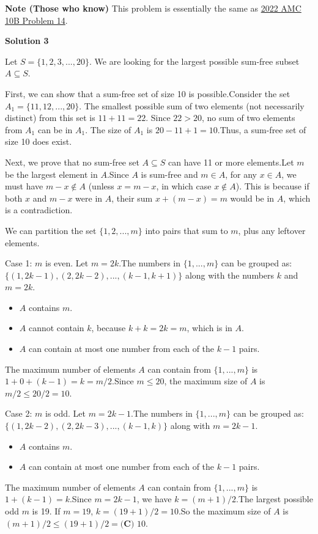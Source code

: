 \begin{enumerate}
 \textbf{Note (Those who know)} This problem is essentially the same as \href{https://artofproblemsolving.com/wiki/index.php?title=2022\_AMC\_10B\_Problems/Problem\_14}{2022 AMC 10B Problem 14}.

 



\textbf{Solution 3}

Let $S = \{1, 2, 3, ..., 20\}$. We are looking for the largest possible sum-free subset $A \subseteq S$.

 First, we can show that a sum-free set of size 10 is possible.Consider the set $A_1 = \{11, 12, ..., 20\}$. The smallest possible sum of two elements (not necessarily distinct) from this set is $11 + 11 = 22$. Since $22 > 20$, no sum of two elements from $A_1$ can be in $A_1$. The size of $A_1$ is $20 - 11 + 1 = 10$.Thus, a sum-free set of size 10 does exist.

 Next, we prove that no sum-free set $A \subseteq S$ can have 11 or more elements.Let $m$ be the largest element in $A$.Since $A$ is sum-free and $m \in A$, for any $x \in A$, we must have $m-x \notin A$ (unless $x = m-x$, in which case $x \notin A$). This is because if both $x$ and $m-x$ were in $A$, their sum $x + (m-x) = m$ would be in $A$, which is a contradiction.

 We can partition the set $\{1, 2, ..., m\}$ into pairs that sum to $m$, plus any leftover elements.

 Case 1: $m$ is even. Let $m = 2k$.The numbers in $\{1, ..., m\}$ can be grouped as:$\{ (1, 2k-1), (2, 2k-2), ..., (k-1, k+1) \}$ along with the numbers $k$ and $m=2k$.

 
            \begin{itemize}
        \item $A$ contains $m$.
        \item $A$ cannot contain $k$, because $k+k = 2k = m$, which is in $A$.
        \item $A$ can contain at most one number from each of the $k-1$ pairs.
            \end{itemize}
            The maximum number of elements $A$ can contain from $\{1, ..., m\}$ is $1 + 0 + (k-1) = k = m/2$.Since $m \le 20$, the maximum size of $A$ is $m/2 \le 20/2 = 10$.

 Case 2: $m$ is odd. Let $m = 2k-1$.The numbers in $\{1, ..., m\}$ can be grouped as:$\{ (1, 2k-2), (2, 2k-3), ..., (k-1, k) \}$ along with $m=2k-1$.

 
            \begin{itemize}
        \item $A$ contains $m$.
        \item $A$ can contain at most one number from each of the $k-1$ pairs.
            \end{itemize}
            The maximum number of elements $A$ can contain from $\{1, ..., m\}$ is $1 + (k-1) = k$.Since $m = 2k-1$, we have $k = (m+1)/2$.The largest possible odd $m$ is 19. If $m=19$, $k = (19+1)/2 = 10$.So the maximum size of $A$ is $(m+1)/2 \le (19+1)/2 = \boxed{\textbf{(C) } 10}$.


\end{enumerate}

